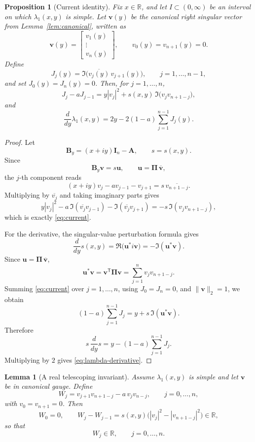 \documentclass[11pt]{article}
\numberwithin{equation}{section}
\newtheorem{proposition}[theorem]{Proposition}
\newtheorem{lemma}[theorem]{Lemma}
\newcommand{\R}{\mathbb R}
\newcommand{\A}{\mathbf A}
\newcommand{\I}{\mathbf I}
\newcommand{\Bmat}{\mathbf B}
\newcommand{\PiM}{\mathbf \Pi}
\begin{document}
\begin{proposition}[Current identity]\label{prop:current}
Fix \(x\in\R\), and let \(I\subset(0,\infty)\) be an interval on which
\(\lambda_1(x,y)\) is simple.  Let \(\bm v(y)\) be the canonical right singular vector
from Lemma~\ref{lem:canonical}, written as
\[
\bm v(y)=
\begin{bmatrix}
v_1(y)\\
\vdots\\
v_n(y)
\end{bmatrix},
\qquad
v_0(y)=v_{n+1}(y)=0.
\]
Define
\[
J_j(y)=\Im\!\bigl(\overline{v_j(y)}\,v_{j+1}(y)\bigr),
\qquad
j=1,\dots,n-1,
\]
and set \(J_0(y)=J_n(y)=0\).  Then, for \(j=1,\dots,n\),
\begin{equation}\label{eq:current}
J_j-aJ_{j-1}
=
y|v_j|^2+s(x,y)\,\Im\!\bigl(v_jv_{n+1-j}\bigr),
\end{equation}
and
\begin{equation}\label{eq:lambda-derivative}
\frac{d}{dy}\lambda_1(x,y)
=
2y-2(1-a)\sum_{j=1}^{n-1}J_j(y).
\end{equation}
\end{proposition}

\begin{proof}
Let
\[
\Bmat_y=(x+iy)\I_n-\A,\qquad s=s(x,y).
\]
Since
\[
\Bmat_y\bm v=s\bm u,
\qquad
\bm u=\PiM\,\overline{\bm v},
\]
the \(j\)-th component reads
\[
(x+iy)v_j-av_{j-1}-v_{j+1}
=
s\,\overline{v_{n+1-j}}.
\]
Multiplying by \(\overline{v_j}\) and taking imaginary parts gives
\[
y|v_j|^2-a\,\Im(\overline{v_j}v_{j-1})-\Im(\overline{v_j}v_{j+1})
=
-s\,\Im(v_jv_{n+1-j}),
\]
which is exactly \eqref{eq:current}.

For the derivative, the singular-value perturbation formula gives
\[
\frac{d}{dy}s(x,y)
=
\Re\!\bigl(\bm u^* i\bm v\bigr)
=
-\Im(\bm u^*\bm v).
\]
Since \(\bm u=\PiM\,\overline{\bm v}\),
\[
\bm u^*\bm v
=
\bm v^{\mathsf T}\PiM\bm v
=
\sum_{j=1}^n v_jv_{n+1-j}.
\]
Summing \eqref{eq:current} over \(j=1,\dots,n\), using \(J_0=J_n=0\), and
\(\|\bm v\|_2=1\), we obtain
\[
(1-a)\sum_{j=1}^{n-1}J_j
=
y+s\,\Im(\bm u^*\bm v).
\]
Therefore
\[
s\,\frac{d}{dy}s
=
y-(1-a)\sum_{j=1}^{n-1}J_j.
\]
Multiplying by \(2\) gives \eqref{eq:lambda-derivative}.
\end{proof}

\begin{lemma}[A real telescoping invariant]\label{lem:W}
Assume \(\lambda_1(x,y)\) is simple and let \(\bm v\) be in canonical gauge.
Define
\[
W_j=v_{j+1}v_{n+1-j}-a\,v_jv_{n-j},
\qquad
j=0,\dots,n,
\]
with \(v_0=v_{n+1}=0\).  Then
\[
W_0=0,
\qquad
W_j-W_{j-1}
=
s(x,y)\bigl(|v_j|^2-|v_{n+1-j}|^2\bigr)\in\R,
\]
so that
\[
W_j\in\R,\qquad j=0,\dots,n.
\]
\end{lemma}
\end{document}
